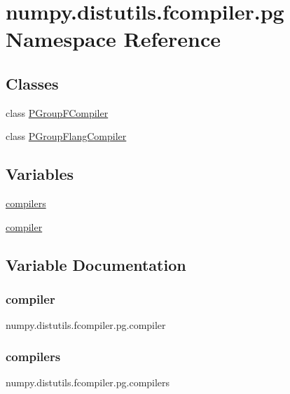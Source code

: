 \hypertarget{namespacenumpy_1_1distutils_1_1fcompiler_1_1pg}{}\section{numpy.\+distutils.\+fcompiler.\+pg Namespace Reference}
\label{namespacenumpy_1_1distutils_1_1fcompiler_1_1pg}
\subsection*{Classes}
\begin{DoxyCompactItemize}
\item 
class \hyperlink{classnumpy_1_1distutils_1_1fcompiler_1_1pg_1_1PGroupFCompiler}{P\+Group\+F\+Compiler}
\item 
class \hyperlink{classnumpy_1_1distutils_1_1fcompiler_1_1pg_1_1PGroupFlangCompiler}{P\+Group\+Flang\+Compiler}
\end{DoxyCompactItemize}
\subsection*{Variables}
\begin{DoxyCompactItemize}
\item 
\hyperlink{namespacenumpy_1_1distutils_1_1fcompiler_1_1pg_a8f4b14a259a69a5e089b4fae1e72fcdc}{compilers}
\item 
\hyperlink{namespacenumpy_1_1distutils_1_1fcompiler_1_1pg_afdd79c926d36c8ca8c132d58ac2a3b98}{compiler}
\end{DoxyCompactItemize}


\subsection{Variable Documentation}
\mbox{\label{namespacenumpy_1_1distutils_1_1fcompiler_1_1pg_afdd79c926d36c8ca8c132d58ac2a3b98}} 
\subsubsection{\texorpdfstring{compiler}{compiler}}
{\footnotesize\ttfamily numpy.\+distutils.\+fcompiler.\+pg.\+compiler}

\mbox{\label{namespacenumpy_1_1distutils_1_1fcompiler_1_1pg_a8f4b14a259a69a5e089b4fae1e72fcdc}} 
\subsubsection{\texorpdfstring{compilers}{compilers}}
{\footnotesize\ttfamily numpy.\+distutils.\+fcompiler.\+pg.\+compilers}

